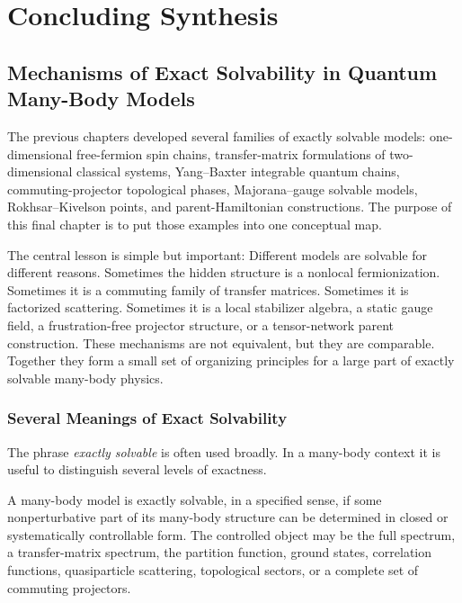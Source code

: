 
\part{Concluding Synthesis}

\chapter{Mechanisms of Exact Solvability in Quantum Many-Body Models}
\label{ch:mechanisms-exact-solvability}

The previous chapters developed several families of exactly solvable models: one-dimensional free-fermion spin chains, transfer-matrix formulations of two-dimensional classical systems, Yang--Baxter integrable quantum chains, commuting-projector topological phases, Majorana--gauge solvable models, Rokhsar--Kivelson points, and parent-Hamiltonian constructions.  The purpose of this final chapter is to put those examples into one conceptual map.

The central lesson is simple but important:
Different models are solvable for different reasons.  Sometimes the hidden structure is a nonlocal fermionization.  Sometimes it is a commuting family of transfer matrices.  Sometimes it is factorized scattering.  Sometimes it is a local stabilizer algebra, a static gauge field, a frustration-free projector structure, or a tensor-network parent construction.  These mechanisms are not equivalent, but they are comparable.  Together they form a small set of organizing principles for a large part of exactly solvable many-body physics.

\section{Several Meanings of Exact Solvability}
\label{sec:several-meanings-solvability}

The phrase \emph{exactly solvable} is often used broadly.  In a many-body context it is useful to distinguish several levels of exactness.

\begin{definition}
A many-body model is exactly solvable, in a specified sense, if some nonperturbative part of its many-body structure can be determined in closed or systematically controllable form.  The controlled object may be the full spectrum, a transfer-matrix spectrum, the partition function, ground states, correlation functions, quasiparticle scattering, topological sectors, or a complete set of commuting projectors.
\end{definition}

